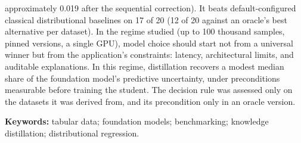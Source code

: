 approximately 0.019 after the sequential correction). It beats
default-configured classical distributional baselines on 17 of 20 (12 of 20 against an oracle's best alternative per dataset). In the regime studied (up to 100
thousand samples, pinned versions, a single GPU), model choice should start
not from a universal winner but from the application's constraints:
latency, architectural limits, and auditable explanations. In this regime,
distillation recovers a modest median share of the foundation model's
predictive uncertainty, under preconditions measurable before training the student. The decision rule was assessed only on the datasets it was derived from, and its precondition only in an oracle version.

\vspace{0.4cm}
\noindent\textbf{Keywords:} tabular data; foundation models;
benchmarking; knowledge distillation; distributional regression.
